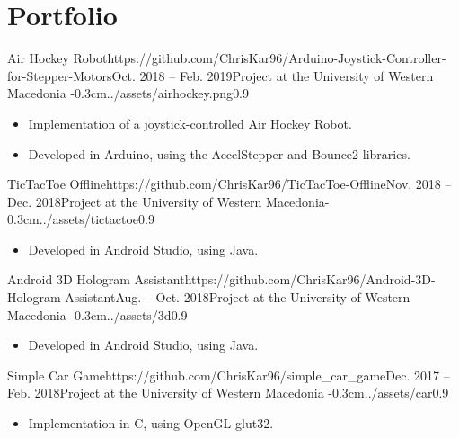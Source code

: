 \documentclass{mycv}
\begin{document}
	\section{Portfolio}
	\begin{EntryDatedImage}{Air Hockey Robot}{https://github.com/ChrisKar96/Arduino-Joystick-Controller-for-Stepper-Motors}{Oct. 2018 -- Feb. 2019}{Project at the University of Western Macedonia }{-0.3cm}{../assets/airhockey.png}{0.9}
	\begin{itemize}
		\item Implementation of a joystick-controlled Air Hockey Robot.
		\item Developed in Arduino, using the AccelStepper and
Bounce2 libraries.
	\end{itemize}
	\end{EntryDatedImage}
	
	\vspace{0.75cm}
	
	\begin{EntryDatedImage}{TicTacToe Offline}{https://github.com/ChrisKar96/TicTacToe-Offline}{Nov. 2018 -- Dec. 2018}{Project at the University of Western Macedonia}{-0.3cm}{../assets/tictactoe}{0.9}
		\begin{itemize}
			\item Developed in Android Studio, using Java.
		\end{itemize}
	\end{EntryDatedImage}

	\vspace{0.75cm}

	\begin{EntryDatedImage}{Android 3D Hologram Assistant}{https://github.com/ChrisKar96/Android-3D-Hologram-Assistant}{Aug. -- Oct. 2018}{Project at the University of Western Macedonia }{-0.3cm}{../assets/3d}{0.9}
	\begin{itemize}
		\item Developed in Android Studio, using Java.
	\end{itemize}
	\end{EntryDatedImage}

	\vspace{0.75cm}

	\begin{EntryDatedImage}{Simple Car Game}{https://github.com/ChrisKar96/simple_car_game}{Dec. 2017 -- Feb. 2018}{Project at the University of Western Macedonia }{-0.3cm}{../assets/car}{0.9}
	\begin{itemize}
		\item Implementation in C, using OpenGL glut32.
	\end{itemize}
	\end{EntryDatedImage}
\end{document}
